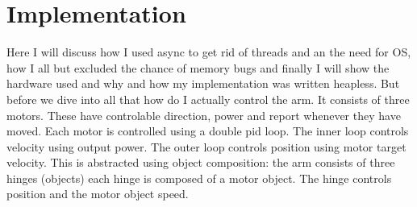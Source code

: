 \documentclass[lang=en, hanging-titles=true]{skrapport}
\begin{document}
\section{Implementation}
\label{sec:impl}
Here I will discuss how I used async to get rid of threads and an the need for OS, how I all but excluded the chance of memory bugs and finally I will show the hardware used and why and how my implementation was written heapless. But before we dive into all that how do I actually control the arm. It consists of three motors. These have controlable direction, power and report whenever they have moved. Each motor is controlled using a double pid loop. The inner loop controls velocity using output power. The outer loop controls position using motor target velocity. This is abstracted using object composition: the arm consists of three hinges (objects) each hinge is composed of a motor object. The hinge controls position and the motor object speed.
\end{document}

